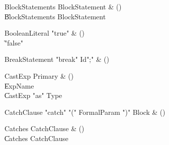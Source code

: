 \begin{bbgrammar}

BlockStatements \label{prod:BlockStatements}  \: BlockStatement & () \\

    \| BlockStatements BlockStatement \\

\end{bbgrammar}

\begin{bbgrammar}

BooleanLiteral \label{prod:BooleanLiteral}  \: \xcd"true"  & () \\

    \| \xcd"false"  \\

\end{bbgrammar}

\begin{bbgrammar}

BreakStatement \label{prod:BreakStatement}  \: \xcd"break" Id\opt \xcd";" & () \\


\end{bbgrammar}

\begin{bbgrammar}

CastExp \label{prod:CastExp}  \: Primary & () \\

    \| ExpName \\
    \| CastExp \xcd"as" Type \\

\end{bbgrammar}

\begin{bbgrammar}

CatchClause \label{prod:CatchClause}  \: \xcd"catch" \xcd"(" FormalParam \xcd")" Block & () \\


\end{bbgrammar}

\begin{bbgrammar}

Catches \label{prod:Catches}  \: CatchClause & () \\

    \| Catches CatchClause \\

\end{bbgrammar}

